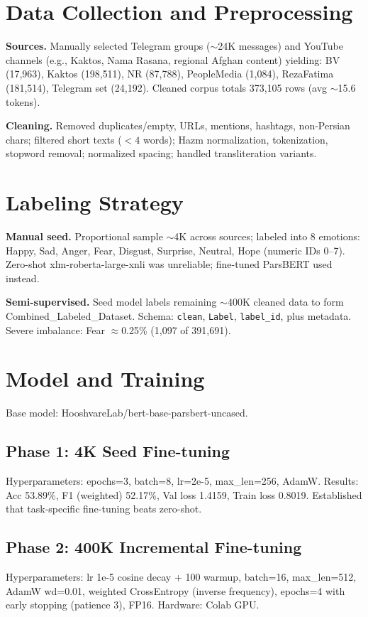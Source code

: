 \documentclass[11pt]{article}
\begin{document}
\section{Data Collection and Preprocessing}
\textbf{Sources.} Manually selected Telegram groups (\(\sim\)24K messages) and YouTube channels (e.g., Kaktos, Nama Rasana, regional Afghan content) yielding: BV (17{,}963), Kaktos (198{,}511), NR (87{,}788), PeopleMedia (1{,}084), RezaFatima (181{,}514), Telegram set (24{,}192). Cleaned corpus totals 373{,}105 rows (avg \(\sim\)15.6 tokens).

\textbf{Cleaning.} Removed duplicates/empty, URLs, mentions, hashtags, non-Persian chars; filtered short texts (\(<4\) words); Hazm normalization, tokenization, stopword removal; normalized spacing; handled transliteration variants.

\section{Labeling Strategy}
\textbf{Manual seed.} Proportional sample \(\sim\)4K across sources; labeled into 8 emotions: Happy, Sad, Anger, Fear, Disgust, Surprise, Neutral, Hope (numeric IDs 0--7). Zero-shot xlm-roberta-large-xnli was unreliable; fine-tuned ParsBERT used instead.

\textbf{Semi-supervised.} Seed model labels remaining \(\sim\)400K cleaned data to form Combined\_Labeled\_Dataset. Schema: \texttt{clean}, \texttt{Label}, \texttt{label\_id}, plus metadata. Severe imbalance: Fear \(\approx\)0.25\% (1{,}097 of 391{,}691).

\section{Model and Training}
Base model: HooshvareLab/bert-base-parsbert-uncased.

\subsection{Phase 1: 4K Seed Fine-tuning}
Hyperparameters: epochs=3, batch=8, lr=2e-5, max\_len=256, AdamW. Results: Acc 53.89\%, F1 (weighted) 52.17\%, Val loss 1.4159, Train loss 0.8019. Established that task-specific fine-tuning beats zero-shot.

\subsection{Phase 2: 400K Incremental Fine-tuning}
Hyperparameters: lr 1e-5 cosine decay + 100 warmup, batch=16, max\_len=512, AdamW wd=0.01, weighted CrossEntropy (inverse frequency), epochs=4 with early stopping (patience 3), FP16. Hardware: Colab GPU.
\end{document}
